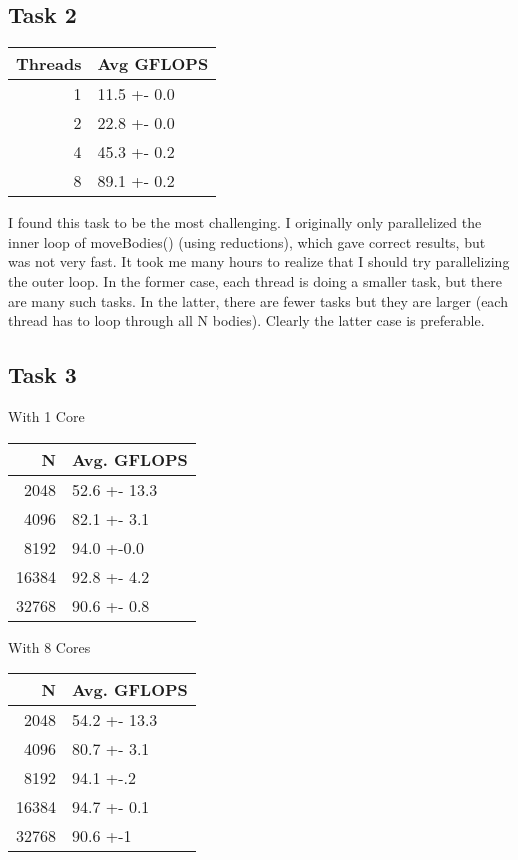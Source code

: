 \documentclass[11pt]{article}
\begin{document}
\subsection{Task 2}
\label{sec:org2375695}

\begin{center}
\begin{tabular}{rl}
Threads & Avg GFLOPS\\
\hline
1 & 11.5 +- 0.0\\
2 & 22.8 +- 0.0\\
4 & 45.3 +- 0.2\\
8 & 89.1 +- 0.2\\
\end{tabular}
\end{center}

I found this task to be the most challenging. I originally only parallelized the inner loop of moveBodies() (using reductions), which gave correct results, but was not very fast. It took me many hours to realize that I should try parallelizing the outer loop. In the former case, each thread is doing a smaller task, but there are many such tasks. In the latter, there are fewer tasks but they are larger (each thread has to loop through all N bodies). Clearly the latter case is preferable. 

\subsection{Task 3}
\label{sec:orgddd4f41}

With 1 Core

\begin{center}
\begin{tabular}{rl}
N & Avg. GFLOPS\\
\hline
2048 & 52.6 +- 13.3\\
4096 & 82.1 +- 3.1\\
8192 & 94.0 +-0.0\\
16384 & 92.8 +- 4.2\\
32768 & 90.6 +- 0.8\\
\end{tabular}
\end{center}


With 8 Cores

\begin{center}
\begin{tabular}{rl}
N & Avg. GFLOPS\\
\hline
2048 & 54.2 +- 13.3\\
4096 & 80.7 +- 3.1\\
8192 & 94.1 +-.2\\
16384 & 94.7 +- 0.1\\
32768 & 90.6 +-1\\
\end{tabular}
\end{center}
\end{document}
